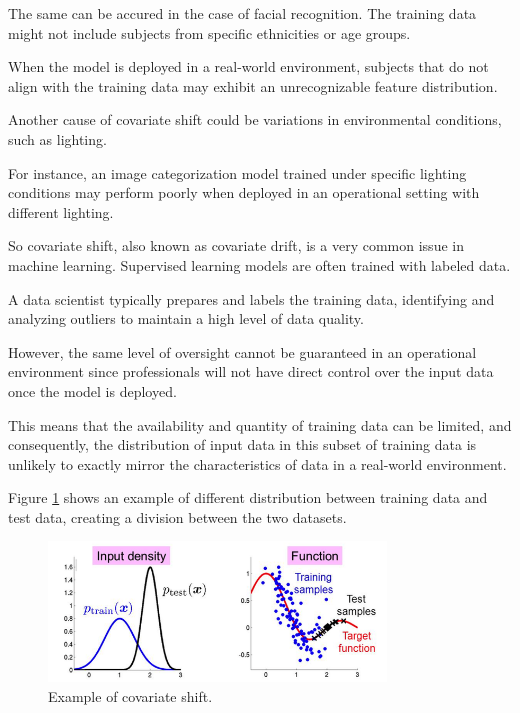 The same can be accured in the case of facial recognition. The training data might not include subjects from specific ethnicities or age groups.

When the model is deployed in a real-world environment, subjects that do not align with the training data may exhibit an unrecognizable feature distribution. 

Another cause of covariate shift could be variations in environmental conditions, such as lighting.

For instance, an image categorization model trained under specific lighting conditions may perform poorly when deployed in an operational setting with different lighting.
	
	\vspace{0.5cm}
	
So covariate shift, also known as covariate drift, is a very common issue in machine learning. Supervised learning models are often trained with labeled data. 

A data scientist typically prepares and labels the training data, identifying and analyzing outliers to maintain a high level of data quality.

However, the same level of oversight cannot be guaranteed in an operational environment since professionals will not have direct control over the input data once the model is deployed.

This means that the availability and quantity of training data can be limited, and consequently, the distribution of input data in this subset of training data is unlikely to exactly mirror the characteristics of data in a real-world environment.

Figure \ref{fig:covariate-shift} shows an example of different distribution between training data and test data, creating a division between the two datasets.  
	

	\begin{figure}[H]
		\centering
		\includegraphics[width=0.8\textwidth]{assets/immagine.png} 
		\caption{Example of covariate shift.}
		\label{fig:covariate-shift}
	\end{figure}

